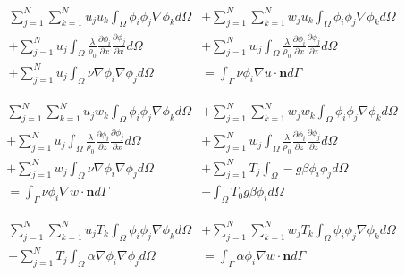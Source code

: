 \begin{align}
\label{eq:femconvection:galerkinu}
\sum^N_{j=1}\sum^N_{k=1}u_ju_k\int_\Omega \phi_i\phi_j\nabla\phi_k d\Omega &+
\sum^N_{j=1}\sum^N_{k=1}w_ju_k\int_\Omega \phi_i\phi_j\nabla\phi_k d\Omega  \\ +
\nonumber
\sum^N_{j=1} u_j\int_\Omega\frac{\lambda}{\rho_0}\frac{\partial \phi_i}{\partial x}\frac{\partial \phi_j}{\partial x} d\Omega &+
\sum^N_{j=1} w_j\int_\Omega\frac{\lambda}{\rho_0}\frac{\partial \phi_i}{\partial x}\frac{\partial \phi_j}{\partial z} d\Omega  \\ +
\nonumber
\sum^N_{j=1} u_j \int_\Omega \nu\nabla\phi_i\nabla\phi_j d\Omega &=
\int_\Gamma \nu\phi_i\nabla u \cdot \mathbf{n} d\Gamma
\end{align}

\begin{align}
\label{eq:femconvection:galerkinw}
\sum^N_{j=1}\sum^N_{k=1}u_jw_k\int_\Omega \phi_i\phi_j\nabla\phi_k d\Omega &+
\sum^N_{j=1}\sum^N_{k=1}w_jw_k\int_\Omega \phi_i\phi_j\nabla\phi_k d\Omega \\ +
\nonumber
\sum^N_{j=1} u_j\int_\Omega \frac{\lambda}{\rho_0}\frac{\partial \phi_i}{\partial z}\frac{\partial \phi_j}{\partial x} d\Omega &+
\sum^N_{j=1} w_j\int_\Omega \frac{\lambda}{\rho_0}\frac{\partial \phi_i}{\partial z}\frac{\partial \phi_j}{\partial z} d\Omega \\ +
\nonumber
\sum^N_{j=1} w_j \int_\Omega \nu\nabla\phi_i\nabla\phi_j d\Omega &+
\sum^N_{j=1}T_j \int_\Omega - g\beta\phi_i\phi_j d\Omega \\
\nonumber
= \int_\Gamma \nu\phi_i\nabla w \cdot \mathbf{n} d\Gamma &- \int_\Omega T_0g\beta\phi_id\Omega
\end{align}

\begin{align}
\label{eq:femconvection:galerkinT}
\sum^N_{j=1}\sum^N_{k=1}u_jT_k\int_\Omega \phi_i\phi_j\nabla\phi_k d\Omega &+
\sum^N_{j=1}\sum^N_{k=1}w_jT_k\int_\Omega \phi_i\phi_j\nabla\phi_k d\Omega \\ +
\nonumber
\sum^N_{j=1} T_j \int_\Omega \alpha\nabla\phi_i\nabla\phi_j d\Omega &=
\int_\Gamma \alpha\phi_i\nabla w \cdot \mathbf{n} d\Gamma
\end{align}

